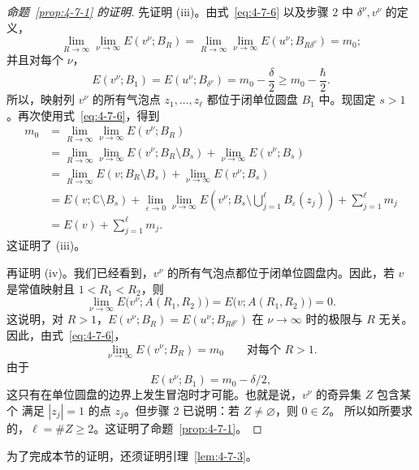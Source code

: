 \begin{proof}[命题~\ref{prop:4-7-1} 的证明]
先证明 (iii)。由式~\eqref{eq:4-7-6} 以及步骤 2 中 $\delta^\nu,v^\nu$ 的定义，
\[
  \lim_{R\to\infty}\lim_{\nu\to\infty}E(v^\nu;B_R)
  =\lim_{R\to\infty}\lim_{\nu\to\infty}
  E(u^\nu;B_{R\delta^\nu})
  =m_0;
\]
并且对每个 $\nu$，
\[
  E(v^\nu;B_1)=E(u^\nu;B_{\delta^\nu})
  =m_0-\frac\delta2\ge m_0-\frac\hbar2.
\]
所以，映射列 $v^\nu$ 的所有气泡点 $z_1,\ldots,z_\ell$ 都位于闭单位圆盘
$B_1$ 中。现固定 $s>1$。再次使用式~\eqref{eq:4-7-6}，得到
\[
  \begin{aligned}
  m_0
  &=\lim_{R\to\infty}\lim_{\nu\to\infty}E(v^\nu;B_R)\\
  &=\lim_{R\to\infty}\lim_{\nu\to\infty}
    E(v^\nu;B_R\setminus B_s)
    +\lim_{\nu\to\infty}E(v^\nu;B_s)\\
  &=\lim_{R\to\infty}E(v;B_R\setminus B_s)
    +\lim_{\nu\to\infty}E(v^\nu;B_s)\\
  &=E(v;\mathbb C\setminus B_s)
    +\lim_{\varepsilon\to0}\lim_{\nu\to\infty}
    E\left(v^\nu;
      B_s\setminus\bigcup_{j=1}^{\ell}B_\varepsilon(z_j)\right)
    +\sum_{j=1}^{\ell}m_j\\
  &=E(v)+\sum_{j=1}^{\ell}m_j.
  \end{aligned}
\]
这证明了 (iii)。

再证明 (iv)。我们已经看到，$v^\nu$ 的所有气泡点都位于闭单位圆盘内。因此，若 $v$
是常值映射且 $1<R_1<R_2$，则
\[
  \lim_{\nu\to\infty}E\bigl(v^\nu;A(R_1,R_2)\bigr)
  =E\bigl(v;A(R_1,R_2)\bigr)=0.
\]
这说明，对 $R>1$，$E(v^\nu;B_R)=E(u^\nu;B_{R\delta^\nu})$ 在
$\nu\to\infty$ 时的极限与 $R$ 无关。因此，由式~\eqref{eq:4-7-6}，
\[
  \lim_{\nu\to\infty}E(v^\nu;B_R)=m_0
  \qquad\text{对每个 }R>1.
\]
由于
\[
  E(v^\nu;B_1)=m_0-\delta/2,
\]
这只有在单位圆盘的边界上发生冒泡时才可能。也就是说，$v^\nu$ 的奇异集 $Z$ 包含某个
满足 $|z_j|=1$ 的点 $z_j$。但步骤 2 已说明：若 $Z\ne\varnothing$，则 $0\in Z$。
所以如所要求的，$\ell=\#Z\ge2$。这证明了命题~\ref{prop:4-7-1}。
\end{proof}
为了完成本节的证明，还须证明引理~\ref{lem:4-7-3}。


